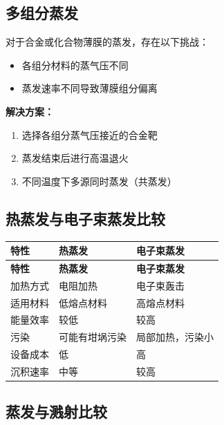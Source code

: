 \documentclass[UTF8,12pt,a4paper]{ctexart}
\begin{document}
\subsection{多组分蒸发}

对于合金或化合物薄膜的蒸发，存在以下挑战：

\begin{itemize}
    \item 各组分材料的蒸气压不同
    \item 蒸发速率不同导致薄膜组分偏离
\end{itemize}

\textbf{解决方案：}
\begin{enumerate}
    \item 选择各组分蒸气压接近的合金靶
    \item 蒸发结束后进行高温退火
    \item 不同温度下多源同时蒸发（共蒸发）
\end{enumerate}

\subsection{热蒸发与电子束蒸发比较}

\begin{longtable}{|L{3.5cm}|L{5.5cm}|L{5.5cm}|}
\hline
\textbf{特性} & \textbf{热蒸发} & \textbf{电子束蒸发} \\
\hline
\endfirsthead
\hline
\textbf{特性} & \textbf{热蒸发} & \textbf{电子束蒸发} \\
\hline
\endhead
\hline
\endfoot
\hline
\endlastfoot

加热方式 & 电阻加热 & 电子束轰击 \\
\hline
适用材料 & 低熔点材料 & 高熔点材料 \\
\hline
能量效率 & 较低 & 较高 \\
\hline
污染 & 可能有坩埚污染 & 局部加热，污染小 \\
\hline
设备成本 & 低 & 高 \\
\hline
沉积速率 & 中等 & 较高 \\
\hline
\end{longtable}

\subsection{蒸发与溅射比较}
\end{document}
